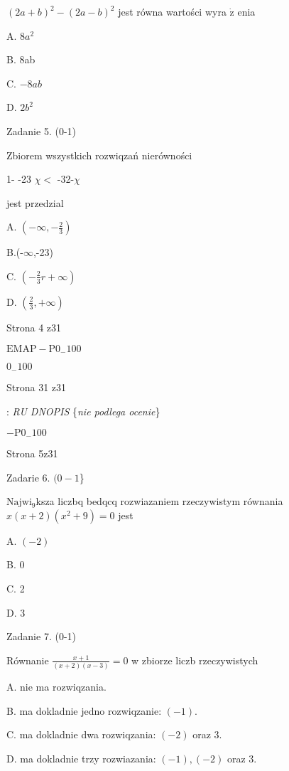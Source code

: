 \documentclass[a4paper,12pt]{article}
\begin{document}
$(2a+b)^{2}-(2a-b)^{2}$ jest równa wartości wyra $\dot{\mathrm{z}}$ enia

A. $8a^{2}$

B. 8ab

C. $-8ab$

D. $2b^{2}$

Zadanie 5. (0-1)

Zbiorem wszystkich rozwiqzań nierówności

1- -23 $\chi<$ -32-$\chi$

jest przedzial

A. $(-\displaystyle \infty,-\frac{2}{3})$

B.(-$\infty$,-23)

C. $(-\displaystyle \frac{2}{3}r+\infty)$

D. $(\displaystyle \frac{2}{3},+\infty)$

Strona 4 z31

$\mathrm{E}\mathrm{M}\mathrm{A}\mathrm{P}-\mathrm{P}0_{-}100$





$0_{-}100$

Strona 31 z31










: {\it RU DNOPIS} \{{\it nie podlega ocenie}\}

$-\mathrm{P}0_{-}100$

Strona 5z31





Zadarie 6. $(0-1$\}

$\mathrm{N}\mathrm{a}\mathrm{j}\mathrm{w}\mathrm{i}_{9}$ksza liczbq bedqcq rozwiazaniem rzeczywistym równania $x(x+2)(x^{2}+9)=0$ jest

A. $(-2)$

B. 0

C. 2

D. 3

Zadanie 7. (0-1)

Równanie $\displaystyle \frac{x+1}{(x+2)(x-3)}=0$ w zbiorze liczb rzeczywistych

A. nie ma rozwiqzania.

B. ma dokladnie jedno rozwiqzanie: $(-1).$

C. ma dokladnie dwa rozwiqzania: $(-2)$ oraz 3.

D. ma dokladnie trzy rozwiazania: $(-1), (-2)$ oraz 3.
\end{document}
